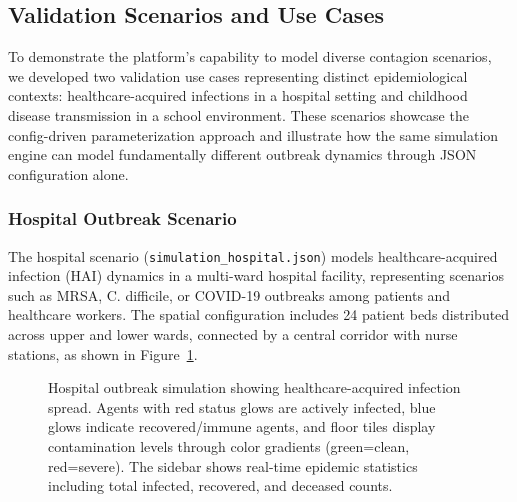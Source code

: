 \subsection{Validation Scenarios and Use Cases}
\label{sec:validation-scenarios}

To demonstrate the platform's capability to model diverse contagion scenarios, we developed two validation use cases representing distinct epidemiological contexts: healthcare-acquired infections in a hospital setting and childhood disease transmission in a school environment. These scenarios showcase the config-driven parameterization approach and illustrate how the same simulation engine can model fundamentally different outbreak dynamics through JSON configuration alone.

\subsubsection{Hospital Outbreak Scenario}
\label{sec:hospital-scenario}

The hospital scenario (\texttt{simulation\_hospital.json}) models healthcare-acquired infection (HAI) dynamics in a multi-ward hospital facility, representing scenarios such as MRSA, C. difficile, or COVID-19 outbreaks among patients and healthcare workers. The spatial configuration includes 24 patient beds distributed across upper and lower wards, connected by a central corridor with nurse stations, as shown in Figure~\ref{fig:simulation-screenshot}.

\begin{figure}[t]
\centering
{}
\caption{Hospital outbreak simulation showing healthcare-acquired infection spread. Agents with red status glows are actively infected, blue glows indicate recovered/immune agents, and floor tiles display contamination levels through color gradients (green=clean, red=severe). The sidebar shows real-time epidemic statistics including total infected, recovered, and deceased counts.}
\label{fig:simulation-screenshot}
\end{figure}

